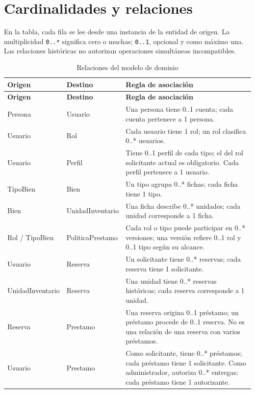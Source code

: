 \section{Cardinalidades y relaciones}

En la tabla, cada fila se lee desde una instancia de la entidad de origen. La multiplicidad \texttt{0..*} significa cero o muchas; \texttt{0..1}, opcional y como m\'aximo una. Las relaciones hist\'oricas no autorizan operaciones simult\'aneas incompatibles.

\begingroup
\small
\begin{longtable}{@{}>{\raggedright\arraybackslash}p{3.1cm}>{\raggedright\arraybackslash}p{3.2cm}>{\raggedright\arraybackslash}p{8cm}@{}}
\caption{Relaciones del modelo de dominio}\label{tab:relaciones}\\
\toprule
\textbf{Origen} & \textbf{Destino} & \textbf{Regla de asociaci\'on} \\
\midrule
\endfirsthead
\toprule
\textbf{Origen} & \textbf{Destino} & \textbf{Regla de asociaci\'on} \\
\midrule
\endhead
\bottomrule
\endfoot
Persona & Usuario & Una persona tiene 0..1 cuenta; cada cuenta pertenece a 1 persona. \\
Usuario & Rol & Cada usuario tiene 1 rol; un rol clasifica 0..* usuarios. \\
Usuario & Perfil & Tiene 0..1 perfil de cada tipo; el del rol solicitante actual es obligatorio. Cada perfil pertenece a 1 usuario. \\
TipoBien & Bien & Un tipo agrupa 0..* fichas; cada ficha tiene 1 tipo. \\
Bien & UnidadInventario & Una ficha describe 0..* unidades; cada unidad corresponde a 1 ficha. \\
Rol / TipoBien & PoliticaPrestamo & Cada rol o tipo puede participar en 0..* versiones; una versi\'on refiere 0..1 rol y 0..1 tipo seg\'un su alcance. \\
Usuario & Reserva & Un solicitante tiene 0..* reservas; cada reserva tiene 1 solicitante. \\
UnidadInventario & Reserva & Una unidad tiene 0..* reservas hist\'oricas; cada reserva corresponde a 1 unidad. \\
Reserva & Prestamo & Una reserva origina 0..1 pr\'estamo; un pr\'estamo procede de 0..1 reserva. No es una relaci\'on de una reserva con varios pr\'estamos. \\
Usuario & Prestamo & Como solicitante, tiene 0..* pr\'estamos; cada pr\'estamo tiene 1 solicitante. Como administrador, autoriza 0..* entregas; cada pr\'estamo tiene 1 autorizante. \\

\end{longtable}
